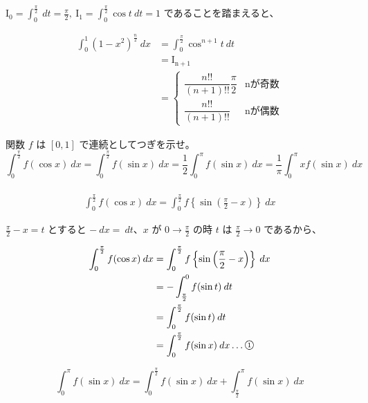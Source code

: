 \documentclass[a4j]{jsarticle}
\newcommand{\ctext}[1]{\raise0.2ex\hbox{\textcircled{\scriptsize{#1}}}} %
\begin{document}
    $\displaystyle \mathrm{I_0} = \int_{0}^{\frac{\pi}{2}}\: dt = \frac{\pi}{2}, \: \mathrm{I_1} = \int_{0}^{\frac{\pi}{2}} \cos t\: dt = 1$ であることを踏まえると、

    \begin{align*}
        \int_{0}^{1} \left(1 - x^2\right)^{\frac{n}{2}}\: dx &= \int_{0}^{\frac{\pi}{2}} \cos^{n + 1}t\: dt \\
        &= \mathrm{I_{n + 1}} \\
        &=
        \begin{cases}
          \dfrac{n!!}{(n + 1)!!}\dfrac{\pi}{2} & \mathrm{nが奇数} \\
          \dfrac{n!!}{(n + 1)!!} & \mathrm{nが偶数}
        \end{cases}
    \end{align*}

    関数 $\displaystyle f$ は $\displaystyle \left[0, 1\right]$ で連続としてつぎを示せ。
    \begin{equation*}
        \int_{0}^{\frac{\pi}{2}} f(\cos x)\: dx = \int_{0}^{\frac{\pi}{2}} f(\sin x) \: dx = \frac{1}{2} \int_{0}^{\pi}f(\sin x) \: dx = \frac{1}{\pi} \int_{0}^{\pi}xf(\sin x) \: dx
    \end{equation*} \\

    \begin{align*}
        \int_{0}^{\frac{\pi}{2}} f(\cos x) \: dx = \int_{0}^{\frac{\pi}{2}} f \left\{ \sin \left(\frac{\pi}{2} - x\right) \right\}  \: dx
    \end{align*}

    $\displaystyle \frac{\pi}{2} - x = t$ とすると $\displaystyle - \: dx = \: dt$、$\displaystyle x$ が $\displaystyle 0 \rightarrow \frac{\pi}{2}$ の時 $\displaystyle t$ は $\displaystyle \frac{\pi}{2} \rightarrow 0$ であるから、

    \begin{align*}
        \int_{0}^{\frac{\pi}{2}} f(\cos x) \: dx &= \int_{0}^{\frac{\pi}{2}} f \left\{ \sin \left(\frac{\pi}{2} - x\right) \right\}  \: dx \\
        &= -\int_{\frac{\pi}{2}}^{0} f(\sin t) \: dt \\
        &= \int_{0}^{\frac{\pi}{2}} f(\sin t)\: dt \\
        &= \int_{0}^{\frac{\pi}{2}} f(\sin x) \: dx \dots \ctext{1}
    \end{align*}

    \begin{equation*}
        \int_{0}^{\pi} f(\sin x) \: dx = \int_{0}^{\frac{\pi}{2}} f(\sin x) \: dx + \int_{\frac{\pi}{2}}^{\pi} f(\sin x) \: dx
    \end{equation*}
\end{document}
